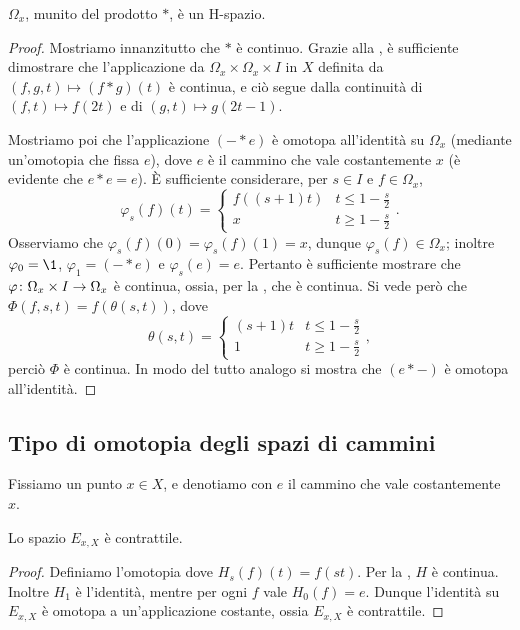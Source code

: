 \begin{proposition}
\(\Omega_x\), munito del prodotto \(\ast\), è un H-spazio.
\end{proposition}
\begin{proof}
Mostriamo innanzitutto che \(\ast\) è continuo. Grazie alla , è sufficiente dimostrare che l'applicazione da \(\Omega_x\times\Omega_x\times I\) in \(X\) definita da \((f,g,t)\mapsto (f\ast g)(t)\) è continua, e ciò segue dalla continuità di \((f,t)\mapsto f(2t)\) e di \((g,t)\mapsto g(2t-1)\).

Mostriamo poi che l'applicazione \((-\ast e)\)
è omotopa all'identità su \(\Omega_x\) (mediante un'omotopia che fissa \(e\)), dove \(e\) è il cammino che vale costantemente \(x\) (è evidente che \(e\ast e=e\)). È sufficiente considerare, per \(s\in I\) e \(f\in\Omega_x\), 
\[
\varphi_s(f)(t)=
\begin{cases}
f((s+1)t)&t\le 1-\frac{s}{2}\\
x&t\ge 1-\frac{s}{2}
\end{cases}.
\]
Osserviamo che \(\varphi_s(f)(0)=\varphi_s(f)(1)=x\), dunque \(\varphi_s(f)\in\Omega_x\); inoltre \(\varphi_0=\1\), \(\varphi_1=(-\ast e)\) e \(\varphi_s(e)=e\). Pertanto è sufficiente mostrare che \(\map{\varphi}{\Omega_x\times I}{\Omega_x}\) è continua, ossia, per la , che
è continua. Si vede però che \(\Phi(f,s,t)=f(\theta(s,t))\), dove
\[
\theta(s,t)=
\begin{cases}
(s+1)t&t\le 1-\frac{s}{2}\\
1&t\ge 1-\frac{s}{2}
\end{cases},
\]
perciò \(\Phi\) è continua. In modo del tutto analogo si mostra che \((e\ast-)\) è omotopa all'identità.
\end{proof}

\subsection{Tipo di omotopia degli spazi di cammini}

Fissiamo un punto \(x\in X\), e denotiamo con \(e\) il cammino che vale costantemente \(x\).

\begin{proposition}
Lo spazio \(E_{x,X}\) è contrattile.
\end{proposition}
\begin{proof}
Definiamo l'omotopia
dove \(H_s(f)(t)=f(st)\). Per la , \(H\) è continua. Inoltre \(H_1\) è l'identità, mentre per ogni \(f\) vale \(H_0(f)=e\). Dunque l'identità su \(E_{x,X}\) è omotopa a un'applicazione costante, ossia \(E_{x,X}\) è contrattile.
\end{proof}

